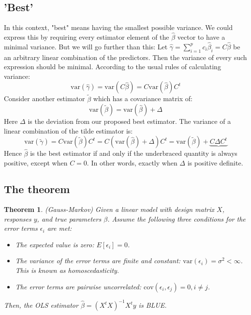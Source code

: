\documentclass[12pt, a4paper]{article}
\newtheorem{theorem}{Theorem}[section]
\numberwithin{equation}{section}
\begin{document}
\subsection{'Best'}
In this context, "best" means having the smallest possible variance. We could express this by requiring every estimator element of the $\hat{\beta}$ vector to have a minimal variance. But we will go further than this: Let $\hat{\gamma}=\sum_{i=1}^p c_i\hat{\beta}_i=C\hat{\beta}$ be an arbitrary linear combination of the predictors. Then the variance of every such expression should be minimal. According to the usual rules of calculating variance:
\begin{equation}
\textrm{var}(\hat{\gamma})=\textrm{var}(C\hat{\beta})=C\textrm{var}(\hat{\beta})C^t
\end{equation}
Consider another estimator $\tilde{\beta}$ which has a covariance matrix of:
\begin{equation}
\textrm{var}(\tilde{\beta})=\textrm{var}(\hat{\beta})+\Delta
\end{equation}
Here $\Delta$ is the deviation from our proposed best estimator. The variance of a linear combination of the tilde estimator is:
\begin{equation}
\textrm{var}(\tilde{\gamma})=C\textrm{var}(\tilde{\beta})C^t=C(\textrm{var}(\hat{\beta})+\Delta)C^t=\textrm{var}(\tilde{\beta})+\underbrace{C\Delta C^t}
\end{equation}
Hence $\hat{\beta}$ is the best estimator if and only if the underbraced quantity is always positive, except when $C=0$. In other words, exactly when $\Delta$ is positive definite.

\subsection{The theorem}

\begin{theorem}
(Gauss-Markov) Given a linear model with design matrix $X$, responses $y$, and true parameters $\beta$. Assume the following three conditions for the error terms $\epsilon_i$ are met:
\begin{itemize}
\item The expected value is zero: $E[\epsilon_i]=0$.
\item The variance of the error terms are finite and constant: $\textrm{var}(\epsilon_i)=\sigma^2<\infty$. This is known as homoscedasticity.
\item The error terms are pairwise uncorrelated: $\textrm{cov}(\epsilon_i,\epsilon_j)=0, i\neq j$.
\end{itemize}
Then, the OLS estimator $\hat{\beta}=(X^t X)^{-1}X^t y$ is BLUE.
\end{theorem}
\end{document}
